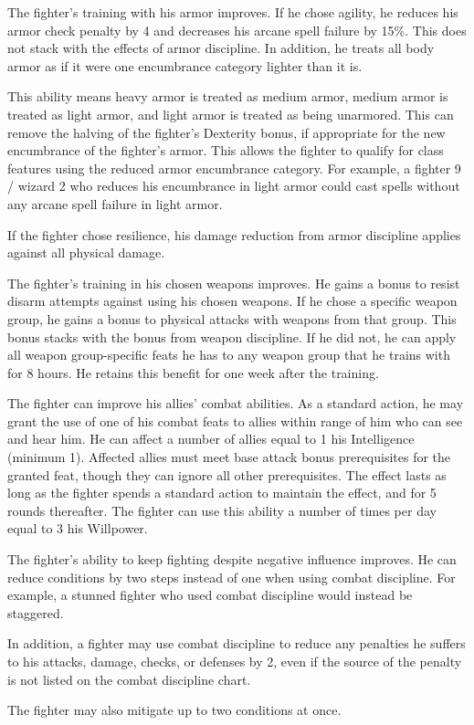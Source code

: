 The fighter's training with his armor improves.
If he chose agility, he reduces his armor check penalty by 4 and decreases his arcane spell failure by 15\%.
This does not stack with the effects of armor discipline.
In addition, he treats all body armor as if it were one encumbrance category lighter than it is.
\par This ability means heavy armor is treated as medium armor, medium armor is treated as light armor, and light armor is treated as being unarmored.
This can remove the halving of the fighter's Dexterity bonus, if appropriate for the new encumbrance of the fighter's armor.
This allows the fighter to qualify for class features using the reduced armor encumbrance category.
For example, a fighter 9 / wizard 2 who reduces his encumbrance in light armor could cast spells without any arcane spell failure in light armor.

If the fighter chose resilience, his damage reduction from armor discipline applies against all physical damage.

The fighter's training in his chosen weapons improves.
He gains a  bonus to resist disarm attempts against using his chosen weapons.
If he chose a specific weapon group, he gains a  bonus to physical attacks with weapons from that group.
This bonus stacks with the bonus from weapon discipline.
If he did not, he can apply all weapon group-specific feats he has to any weapon group that he trains with for 8 hours.
He retains this benefit for one week after the training.

The fighter can improve his allies' combat abilities.
As a standard action, he may grant the use of one of his combat feats to allies within \rngclose range of him who can see and hear him.
He can affect a number of allies equal to 1 \add his Intelligence (minimum 1).
Affected allies must meet base attack bonus prerequisites for the granted feat, though they can ignore all other prerequisites.
The effect lasts as long as the fighter spends a standard action to maintain the effect, and for 5 rounds thereafter.
The fighter can use this ability a number of times per day equal to 3 \add his Willpower.

The fighter's ability to keep fighting despite negative influence improves.
He can reduce conditions by two steps instead of one when using combat discipline.
For example, a stunned fighter who used combat discipline would instead be staggered.
\par In addition, a fighter may use combat discipline to reduce any penalties he suffers to his attacks, damage, checks, or defenses by 2, even if the source of the penalty is not listed on the combat discipline chart.
\par The fighter may also mitigate up to two conditions at once.

